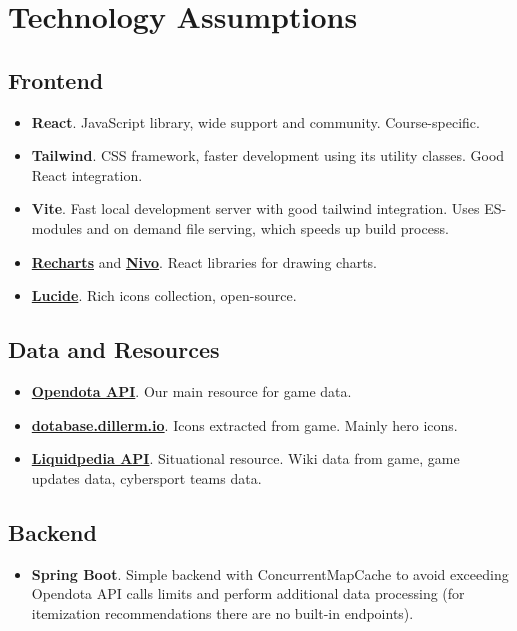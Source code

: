 \section{Technology Assumptions}

 \subsection{Frontend}
\begin{itemize}

    \item \textbf{React}. JavaScript library, wide support and community. Course-specific.
    \item \textbf{Tailwind}. CSS framework, faster development using its utility classes. Good React integration.
    \item \textbf{Vite}. Fast local development server with good tailwind integration.
    Uses ES-modules and on demand file serving, which speeds up build process.

    \item \textbf{\href{https://recharts.org}{Recharts}} and \textbf{\href{https://nivo.rocks/}{Nivo}}. React libraries for drawing charts.
    \item \textbf{\href{https://lucide.dev/}{Lucide}}. Rich icons collection, open-source.

\end{itemize}

\subsection{Data and Resources}

\begin{itemize}

    \item \textbf{\href{https://docs.opendota.com/}{Opendota API}}. Our main resource for game data.
    \item \textbf{\href{https://dotabase.dillerm.io/}{dotabase.dillerm.io}}. Icons extracted from game. Mainly hero icons.
    \item \textbf{\href{https://liquipedia.net/dota2/Main_Page}{Liquidpedia API}}. Situational resource. Wiki data from game, game updates data, cybersport teams data.

\end{itemize}

\subsection{Backend}

\begin{itemize}

    \item \textbf{Spring Boot}. Simple backend with ConcurrentMapCache to avoid exceeding Opendota API calls limits and
    perform additional data processing (for itemization recommendations there are no built-in endpoints).

\end{itemize}